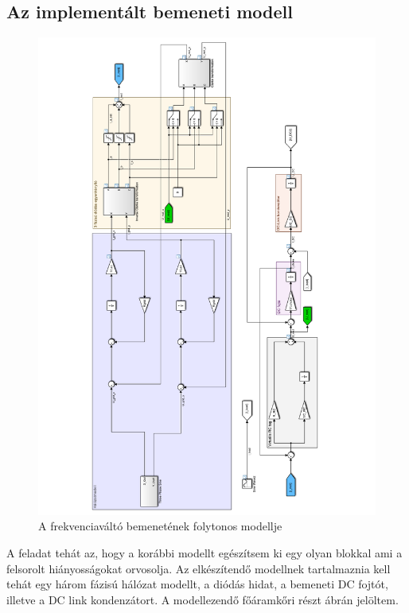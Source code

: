 \subsection{Az implementált bemeneti modell}

\begin{figure}[]
	\centering
	\includegraphics[width = 1.2\textwidth]{figures/model_continous.pdf}
	\caption{A frekvenciaváltó bemenetének folytonos modellje} 
	\label{fig:cont_input_model}
\end{figure}

A feladat tehát az, hogy a korábbi modellt egészítsem ki egy olyan blokkal ami a felsorolt hiányosságokat orvosolja. Az elkészítendő modellnek tartalmaznia kell tehát egy három fázisú hálózat modellt, a diódás hidat, a bemeneti DC fojtót, illetve a DC link kondenzátort. A modellezendő főáramkőri részt  ábrán jelöltem. 

